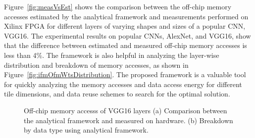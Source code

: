 Figure~\ref{fig:measVsEst} shows the comparison between the off-chip memory accesses estimated by the analytical framework and measurements performed on Xilinx FPGA for different layers of varying shapes and sizes of a popular CNN, VGG16. The experimental results on popular CNNs, AlexNet, and VGG16, show that the difference between estimated and measured off-chip memory accesses is less than 4\%. The framework is also helpful in analyzing the layer-wise distribution and breakdown of memory accesses, as shown in Figure~\ref{fig:ifmOfmWtsDistribution}. The proposed framework is a valuable tool for quickly analyzing the memory accesses and data access energy for different tile dimensions, and data reuse schemes to search for the optimal solution. 
\begin{figure}[!htb]
	\centering
	\captionsetup{font=sf}
	\hfil
	\hfil   
	\caption{Off-chip memory accesss of VGG16 layers (a) Comparison between the analytical framework and measured on hardware. (b) Breakdown by data type using analytical framework.}
	\label{fig:nnLayerData}
\end{figure}
